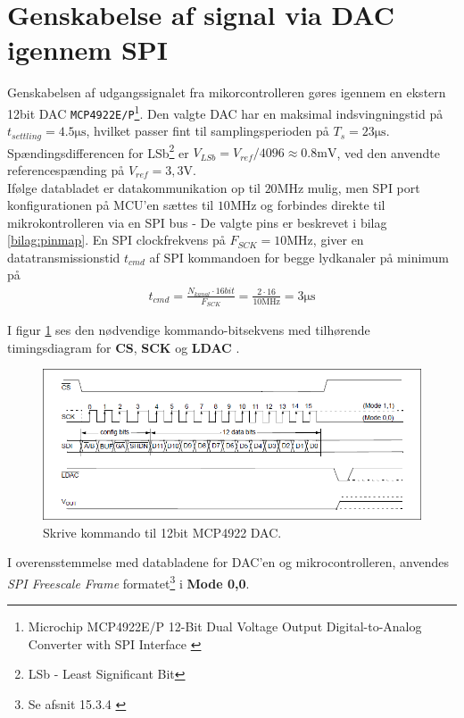 \section{Genskabelse af signal via DAC igennem SPI}
Genskabelsen af udgangssignalet fra mikorcontrolleren gøres igennem en ekstern 12bit DAC \texttt{MCP4922E/P}\footnote{Microchip MCP4922E/P 12-Bit Dual Voltage Output Digital-to-Analog Converter with SPI Interface \cite{mcp4922} }.
Den valgte DAC har en maksimal indsvingningstid på $t_{settling} = \num{4.5}\si{\micro\second}$, hvilket passer fint til samplingsperioden på $T_s = 23\si{\micro\second}$. 
\\
Spændingsdifferencen for LSb\footnote{LSb - Least Significant Bit} er $ V_{LSb} = V_{ref} / 4096 \approx \num{0,8}\si{\milli\volt} $, ved den anvendte referencespænding på $V_{ref} = 3,3\si{\volt}$. 
\\
Ifølge databladet er datakommunikation op til $20\si{\mega\hertz}$ mulig, men SPI port konfigurationen på MCU'en sættes til $10\si{\mega\hertz}$ og forbindes direkte til mikrokontrolleren via en SPI bus - De valgte pins er beskrevet i bilag \ref{bilag:pinmap}. 
En SPI clockfrekvens på $F_{SCK} = 10\si{\mega\hertz}$, giver en datatransmissionstid $t_{cmd}$ af SPI kommandoen for begge lydkanaler på minimum på  
\begin{align} 
t_{cmd} = \frac{N_{kanal} \cdot 16bit}{F_{SCK}} = \frac{2 \cdot 16}{10\si{\mega\hertz}} = 3\si{\micro\second} 
\end{align} 

I figur \ref{fig:dac12bit_writecmd} ses den nødvendige kommando-bitsekvens med tilhørende timingsdiagram for \textbf{CS}, \textbf{SCK} og \textbf{LDAC}  .\\ 

\begin{figure}[h!] 
	\centering 
	\includegraphics[width=.8\textwidth]{billeder/dac12bit_writecmd.png} 
	\caption{Skrive kommando til 12bit MCP4922 DAC.\cite[s. 25]{mcp4922}} 
	\label{fig:dac12bit_writecmd} 
\end{figure} 

I overensstemmelse med databladene for DAC'en og mikrocontrolleren, anvendes \emph{SPI Freescale Frame} formatet\footnote{Se afsnit 15.3.4 \cite[s. 954]{tm4c123gh6pm}} i \textbf{Mode 0,0}. 



